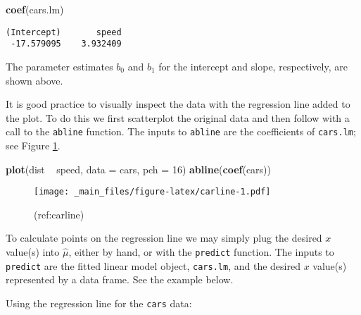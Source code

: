 \documentclass[]{book}
\newenvironment{Shaded}{\begin{snugshade}}{\end{snugshade}}
\newcommand{\KeywordTok}[1]{\textcolor[rgb]{0.13,0.29,0.53}{\textbf{{#1}}}}
\newcommand{\DataTypeTok}[1]{\textcolor[rgb]{0.13,0.29,0.53}{{#1}}}
\newcommand{\DecValTok}[1]{\textcolor[rgb]{0.00,0.00,0.81}{{#1}}}
\newcommand{\StringTok}[1]{\textcolor[rgb]{0.31,0.60,0.02}{{#1}}}
\newcommand{\NormalTok}[1]{{#1}}
\numberwithin{equation}{chapter}
\numberwithin{figure}{chapter}
\theoremstyle{plain}
\theoremstyle{definition}
\theoremstyle{remark}
\theoremstyle{definition}
\theoremstyle{definition}
\theoremstyle{remark}
\let\BeginKnitrBlock\begin \let\EndKnitrBlock\end
\begin{document}
\begin{Shaded}
\begin{Highlighting}[]
\KeywordTok{coef}\NormalTok{(cars.lm)}
\end{Highlighting}
\end{Shaded}

\begin{verbatim}
(Intercept)       speed 
 -17.579095    3.932409 
\end{verbatim}

The parameter estimates \(b_{0}\) and \(b_{1}\) for the intercept and
slope, respectively, are shown above.

It is good practice to visually inspect the data with the regression
line added to the plot. To do this we first scatterplot the original
data and then follow with a call to the \texttt{abline} function. The
inputs to \texttt{abline} are the coefficients of \texttt{cars.lm}; see
Figure \ref{fig:carline}.

\begin{Shaded}
\begin{Highlighting}[]
\KeywordTok{plot}\NormalTok{(dist ~}\StringTok{ }\NormalTok{speed, }\DataTypeTok{data =} \NormalTok{cars, }\DataTypeTok{pch =} \DecValTok{16}\NormalTok{)}
\KeywordTok{abline}\NormalTok{(}\KeywordTok{coef}\NormalTok{(cars))}
\end{Highlighting}
\end{Shaded}

\begin{figure}[htbp]
\centering
\texttt{[image: \_main\_files/figure-latex/carline-1.pdf]}
\caption{\label{fig:carline}(ref:carline)}
\end{figure}




To calculate points on the regression line we may simply plug the
desired \(x\) value(s) into \(\hat{\mu}\), either by hand, or with the
\texttt{predict} function. The inputs to \texttt{predict} are the fitted
linear model object, \texttt{cars.lm}, and the desired \(x\) value(s)
represented by a data frame. See the example below.

\bigskip

\BeginKnitrBlock{example}
\protect\hypertarget{ex:regline-cars-interpret}{}{\label{ex:regline-cars-interpret}}Using
the regression line for the \texttt{cars} data:
\EndKnitrBlock{example}
\end{document}
